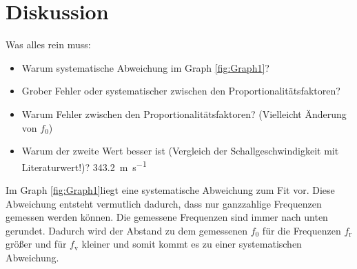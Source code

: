 
\section{Diskussion}
\label{sec:Diskussion}

Was alles rein muss:
\begin{itemize}
	\item Warum systematische Abweichung im Graph \ref{fig:Graph1}? 
	\item Grober Fehler oder systematischer zwischen den Proportionalitätsfaktoren?
	\item Warum Fehler zwischen den Proportionalitätsfaktoren? (Vielleicht Änderung von $f_0$)
	\item Warum der zweite Wert besser ist (Vergleich der Schallgeschwindigkeit mit Literaturwert!)? \SI{343.2}{\meter\per\second} \cite{c}
	
\end{itemize}

Im Graph \ref{fig:Graph1}liegt eine systematische Abweichung zum Fit vor. Diese Abweichung entsteht vermutlich dadurch, dass nur ganzzahlige Frequenzen gemessen werden können. Die gemessene Frequenzen sind immer nach unten gerundet. Dadurch wird der Abstand zu dem gemessenen $f_0$ für die Frequenzen $f_\text{r}$ größer und für $f_\text{v}$ kleiner und somit kommt es zu einer systematischen Abweichung.


